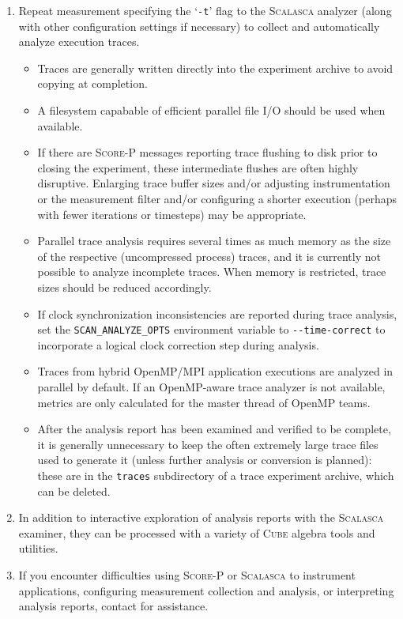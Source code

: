\documentclass[a4paper]{article}
\newcommand{\Scalasca}{\textsc{Scalasca}\xspace}
\newcommand{\Scorep}{\textsc{Score-P}\xspace}
\newcommand{\Cube}{\textsc{Cube}\xspace}
\begin{document}
\begin{enumerate}
\item Repeat measurement specifying the `\verb+-t+' flag to the
\Scalasca analyzer (along with other configuration settings if
necessary) to collect and automatically analyze execution traces.

\begin{itemize}
\item Traces are generally written directly into the experiment archive to
avoid copying at completion. 
\item A filesystem capabable of efficient parallel file I/O should be used when available.
\item If there are \Scorep messages reporting trace flushing to disk prior to
closing the experiment, these intermediate flushes are often highly
disruptive.  
Enlarging trace buffer sizes and/or adjusting
instrumentation or the measurement filter and/or configuring a shorter
execution (perhaps with fewer iterations or timesteps) may be appropriate.
\item Parallel trace analysis requires several times as much memory as the
size of the respective (uncompressed process) traces, and it is currently not
possible to analyze incomplete traces.  When memory is restricted,
trace sizes should be reduced accordingly.
\item If clock synchronization inconsistencies are reported during trace
analysis, set the \verb+SCAN_ANALYZE_OPTS+ environment variable to
\verb+--time-correct+ to incorporate a logical clock correction step during
analysis.
\item Traces from hybrid OpenMP/MPI application executions are analyzed
in parallel by default.  If an OpenMP-aware trace analyzer is not available,
metrics are only calculated for the master thread of OpenMP teams.
\item After the analysis report has been examined and verified to be
complete, it is generally unnecessary to keep the often extremely large
trace files used to generate it (unless further analysis or conversion
is planned): these are in the \verb+traces+
subdirectory of a trace experiment archive, which can be deleted.
\end{itemize}

\item In addition to interactive exploration of analysis reports with
the \Scalasca examiner, they can be processed with a variety of
\Cube algebra tools and utilities.

\item If you encounter difficulties using \Scorep or \Scalasca to instrument applications,
configuring measurement collection and analysis, or interpreting
analysis reports, contact \texttt{\PackageBugreport} for assistance.

\end{enumerate}
\end{document}
